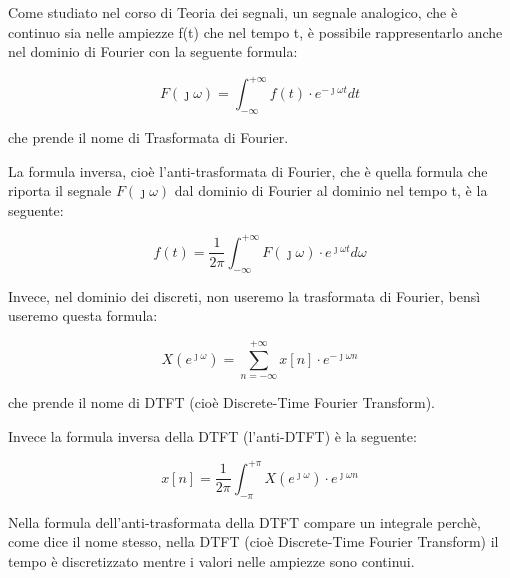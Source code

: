 Come studiato nel corso di Teoria dei segnali, 
un segnale analogico, che è continuo sia nelle ampiezze f(t) che nel tempo t, 
è possibile rappresentarlo anche nel dominio di Fourier con la seguente formula: 

{
    \Large 
    \begin{equation}
        F\left( \jmath \omega \right) 
        = 
        \int_{- \infty}^{+ \infty}
        f(t) \cdot e^{- \jmath \omega t} 
        dt 
    \end{equation}
} 

che prende il nome di Trasformata di Fourier. \newline 

La formula inversa, cioè l'anti-trasformata di Fourier, 
che è quella formula che riporta il segnale $F \left(\jmath \omega\right)$ dal dominio di Fourier al dominio nel tempo t, 
è la seguente: 

{
    \Large 
    \begin{equation}
        f \left( t\right) 
        = 
        \dfrac{1}{2 \pi}
        \int_{- \infty}^{+ \infty}
        F \left(\jmath \omega \right) \cdot e^{\jmath \omega t} 
        d\omega
    \end{equation}
}

Invece, nel dominio dei discreti, non useremo la trasformata di Fourier, bensì useremo questa formula: 

{
    \Large 
    \begin{equation}
        X \left( e^{\jmath \omega}\right)
        = 
        \sum_{n = - \infty}^{+ \infty}
        x \left[ n\right]
        \cdot 
        e^{- \jmath \omega n}
    \end{equation}
}

che prende il nome di DTFT (cioè Discrete-Time Fourier Transform). \newline 

Invece la formula inversa della DTFT (l'anti-DTFT) è la seguente: 

{
    \Large 
    \begin{equation}
        x \left[ n\right]
        = 
        \dfrac{1}{2 \pi} 
        \int_{- \pi}^{+ \pi}
        X \left(e^{\jmath \omega}\right)
        \cdot 
        e^{\jmath \omega n}
    \end{equation}
}

\begin{tcolorbox}
Nella formula dell'anti-trasformata della DTFT compare un integrale perchè, 
come dice il nome stesso, nella DTFT (cioè Discrete-Time Fourier Transform) 
il tempo è discretizzato mentre i valori nelle ampiezze sono continui. 
\end{tcolorbox}

